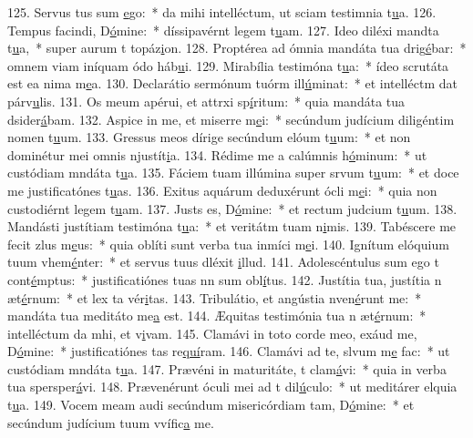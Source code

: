 125. Servus tus sum \uline{e}go:~* da mihi intelléctum, ut sciam testimnia t\uline{u}a.
126. Tempus facindi, D\uline{ó}mine:~* díssipavérnt legem t\uline{u}am.
127. Ideo diléxi mandta t\uline{u}a,~* super aurum t topáz\uline{i}on.
128. Proptérea ad ómnia mandáta tua drig\uline{é}bar:~* omnem viam iníquam ódo háb\uline{u}i.
129. Mirabília testimóna t\uline{u}a:~* ídeo scrutáta est ea nima m\uline{e}a.
130. Declarátio sermónum tuórm ill\uline{ú}minat:~* et intelléctm dat párv\uline{u}lis.
131. Os meum apérui, et attrxi sp\uline{í}ritum:~* quia mandáta tua dsider\uline{á}bam.
132. Aspice in me, et miserre m\uline{e}i:~* secúndum judícium diligéntim nomen t\uline{u}um.
133. Gressus meos dírige secúndum elóum t\uline{u}um:~* et non dominétur mei omnis njustít\uline{i}a.
134. Rédime me a calúmnis h\uline{ó}minum:~* ut custódiam mndáta t\uline{u}a.
135. Fáciem tuam illúmina super srvum t\uline{u}um:~* et doce me justificatónes t\uline{u}as.
136. Exitus aquárum deduxérunt ócli m\uline{e}i:~* quia non custodiérnt legem t\uline{u}am.
137. Justs es, D\uline{ó}mine:~* et rectum judcium t\uline{u}um.
138. Mandásti justítiam testimóna t\uline{u}a:~* et veritátm tuam n\uline{i}mis.
139. Tabéscere me fecit zlus m\uline{e}us:~* quia oblíti sunt verba tua inmíci m\uline{e}i.
140. Ignítum elóquium tuum vhem\uline{é}nter:~* et servus tuus dléxit \uline{i}llud.
141. Adolescéntulus sum ego t cont\uline{é}mptus:~* justificatiónes tuas nn sum obl\uline{í}tus.
142. Justítia tua, justítia n æt\uline{é}rnum:~* et lex ta vér\uline{i}tas.
143. Tribulátio, et angústia nven\uline{é}runt me:~* mandáta tua meditáto me\uline{a} est.
144. Æquitas testimónia tua n æt\uline{é}rnum:~* intelléctum da mhi, et v\uline{i}vam.
145. Clamávi in toto corde meo, exáud me, D\uline{ó}mine:~* justificatiónes tas re\uline{quí}ram.
146. Clamávi ad te, slvum m\uline{e} fac:~* ut custódiam mndáta t\uline{u}a.
147. Prævéni in maturitáte, t clam\uline{á}vi:~* quia in verba tua spersper\uline{á}vi.
148. Prævenérunt óculi mei ad t dil\uline{ú}culo:~* ut meditárer elquia t\uline{u}a.
149. Vocem meam audi secúndum misericórdiam tam, D\uline{ó}mine:~* et secúndum judícium tuum vvífic\uline{a} me.
